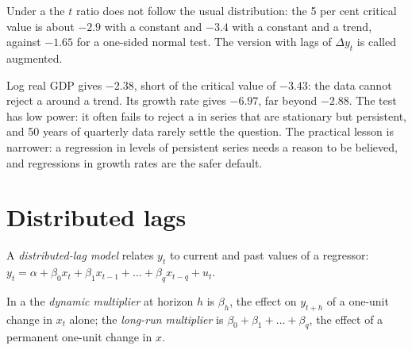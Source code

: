 Under a  the $t$ ratio does not follow the usual distribution: the 5 per cent critical value is about $-2.9$ with a
constant and $-3.4$ with a constant and a trend, against $-1.65$ for a one-sided normal test. The version with lags of
$\Delta y_t$ is called augmented.

\label{lst:b2:time-series:adf}

\label{out:b2:time-series:adf}

Log real GDP gives $-2.38$, short of the critical value of $-3.43$: the data cannot reject a  around a trend.
Its growth rate gives $-6.97$, far beyond $-2.88$. The test has low power: it often fails to reject a  in series
that are stationary but persistent, and 50 years of quarterly data rarely settle the question. The practical lesson is
narrower: a regression in levels of persistent series needs a reason to be believed, and regressions in growth rates are
the safer default.

\section{Distributed lags}\label{sec:b2:time-series:distributed-lags}

\begin{definition}\label{def:b2:time-series:distributed-lag}
A \emph{distributed-lag model} relates $y_t$ to current and past values of a regressor:
$y_t = \alpha + \beta_0x_t + \beta_1x_{t-1} + \dots + \beta_qx_{t-q} + u_t$.
\end{definition}

\begin{definition}\label{def:b2:time-series:dynamic-multiplier}
In a  the \emph{dynamic multiplier} at horizon $h$ is $\beta_h$, the effect
on $y_{t+h}$ of a one-unit change in $x_t$ alone; the \emph{long-run multiplier} is $\beta_0 + \beta_1 + \dots + \beta_q$,
the effect of a permanent one-unit change in $x$.
\end{definition}

